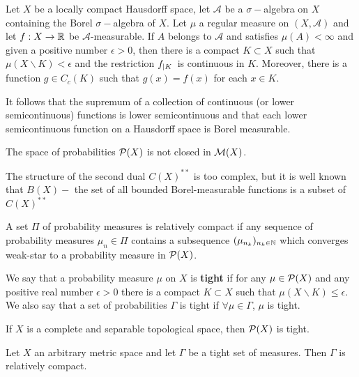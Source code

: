 \begin{theorem}[Luizin]
	Let $X$ be a locally compact Hausdorff space, let $\mathcal A$ be a $\sigma-$algebra on $X$ containing the Borel $\sigma-$algebra of $X$. Let $\mu$ a regular measure on $(X, \mathcal A)$ and let $f:X\rightarrow \Real$ be $\mathcal A$-measurable. If $A$ belongs to $\mathcal{A}$ and satisfies $\mu(A)<\infty$ and given a positive number $\epsilon>0$, then there is a compact $K\subset X$ such that $\mu(X\backslash K)<\epsilon$ and the restriction $\domainrestr{K}{f}$ is continuous in $K$. Moreover, there is a function $g\in C_c(K)$ such that $g(x)=f(x)$ for each $x\in K$. 
\end{theorem}

It follows that the supremum of a collection of continuous (or lower semicontinuous) functions is
lower semicontinuous and that each lower semicontinuous function on a Hausdorff
space is Borel measurable.



The space of probabilities $\PlanSp(X)$ is not closed in $\MeasureSp(X)$. 


The structure of the second dual $C(X)^{**}$ is too complex, but it is well known that $B(X)-$ the set of all bounded Borel-measurable functions is a subset of $C(X)^{**}$


A set $\Pi$ of probability measures is relatively compact if any sequence of probability measures $\mu_n \in \Pi$ contains a subsequence $(\mu_{n_k})_{n_k\in \Naturals}$ which converges weak-star to a probability measure in $\PlanSp(X)$.

We say that a probability measure $\mu$ on $X$ is \textbf{tight} if for any $\mu\in \PlanSp(X)$ and any positive real number $\epsilon>0$ there is a compact $K\subset X$ such that $\mu(X\backslash K)\leq \epsilon$. We also say that a set of probabilities $\Gamma$ is tight if $\forall \mu \in \Gamma$, $\mu$ is tight.



\begin{theorem}
	If $X$ is a complete and separable topological space, then $\PlanSp(X)$ is tight.
\end{theorem}

\begin{theorem}[Prohorov]
	Let $X$ an arbitrary metric space and let $\Gamma$ be a tight set of measures. Then $\Gamma$ is relatively compact.
\end{theorem}


